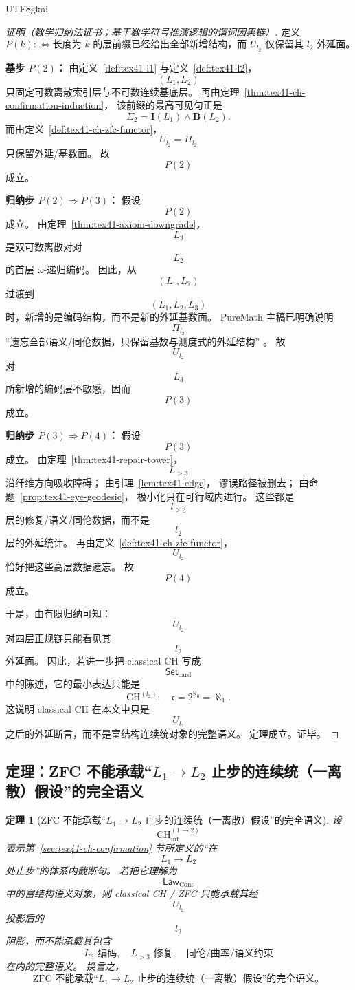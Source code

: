 \documentclass[12pt]{article}
\newtheorem{theorem}{定理}[section]
\newcommand{\CHint}{\mathrm{CH}_{\mathrm{int}}}
\newcommand{\LawCont}{\mathsf{Law}_{\mathrm{Cont}}}
\newcommand{\SetCard}{\mathsf{Set}_{\mathrm{card}}}
\newcommand{\ForgetLtwo}{U_{l_2}}
\newcommand{\ProjLtwo}{\Pi_{l_2}}
\newcommand{\CHltwo}{\mathrm{CH}^{(l_2)}}
\begin{document}
\begin{CJK*}{UTF8}{gkai}
\begin{proof}[证明（数学归纳法证书；基于数学符号推演逻辑的谓词因果链）]
定义
\[
  P(k)
  :
  \Longleftrightarrow
  \text{长度为 }k\text{ 的层前缀已经给出全部新增结构，而 }\ForgetLtwo\text{ 仅保留其 }l_2\text{ 外延面。}
\]

\textbf{基步 $P(2)$：}
由定义~\ref{def:tex41-l1} 与定义~\ref{def:tex41-l2}，
\[
  (L_1,L_2)
\]
只固定可数离散索引层与不可数连续基底层。
再由定理~\ref{thm:tex41-ch-confirmation-induction}，
该前缀的最高可见句正是
\[
  \Sigma_2=\mathbf I(L_1)\wedge \mathbf B(L_2).
\]
而由定义~\ref{def:tex41-ch-zfc-functor}，
\[
  \ForgetLtwo=\ProjLtwo
\]
只保留外延/基数面。
故
\[
  P(2)
\]
成立。

\textbf{归纳步 $P(2)\Rightarrow P(3)$：}
假设
\[
  P(2)
\]
成立。
由定理~\ref{thm:tex41-axiom-downgrade}，
\[
  L_3
\]
是双可数离散对对
\[
  L_2
\]
的首层 $\omega$-递归编码。
因此，从
\[
  (L_1,L_2)
\]
过渡到
\[
  (L_1,L_2,L_3)
\]
时，新增的是编码结构，而不是新的外延基数面。
PureMath 主稿已明确说明
\[
  \ProjLtwo
\]
“遗忘全部语义/同伦数据，只保留基数与测度式的外延结构”
\cite{GaoZheng2025GFramework}。
故
\[
  \ForgetLtwo
\]
对
\[
  L_3
\]
所新增的编码层不敏感，因而
\[
  P(3)
\]
成立。

\textbf{归纳步 $P(3)\Rightarrow P(4)$：}
假设
\[
  P(3)
\]
成立。
由定理~\ref{thm:tex41-repair-tower}，
\[
  L_{>3}
\]
沿纤维方向吸收障碍；
由引理~\ref{lem:tex41-edge}，
谬误路径被删去；
由命题~\ref{prop:tex41-eye-geodesic}，
极小化只在可行域内进行。
这些都是
\[
  l_{\ge3}
\]
层的修复/语义/同伦数据，而不是
\[
  l_2
\]
层的外延统计。
再由定义~\ref{def:tex41-ch-zfc-functor}，
\[
  \ForgetLtwo
\]
恰好把这些高层数据遗忘。
故
\[
  P(4)
\]
成立。

于是，由有限归纳可知：
\[
  \ForgetLtwo
\]
对四层正规链只能看见其
\[
  l_2
\]
外延面。
因此，若进一步把 classical CH 写成
\[
  \SetCard
\]
中的陈述，它的最小表达只能是
\[
  \CHltwo:\quad \mathfrak c=2^{\aleph_0}=\aleph_1.
\]
这说明 classical CH 在本文中只是
\[
  \ForgetLtwo
\]
之后的外延断言，而不是富结构连续统对象的完整语义。
定理成立。证毕。
\end{proof}

\subsection{定理：ZFC 不能承载“$L_1\to L_2$ 止步的连续统（一离散）假设”的完全语义}
\label{subsec:tex41-ch-zfc-theorem}

\begin{theorem}[ZFC 不能承载“$L_1\to L_2$ 止步的连续统（一离散）假设”的完全语义]
\label{thm:tex41-ch-zfc-limit}
设
\[
  \CHint^{(1\to2)}
\]
表示第~\ref{sec:tex41-ch-confirmation} 节所定义的“在
\[
  L_1\to L_2
\]
处止步”的体系内截断句。
若把它理解为
\[
  \LawCont
\]
中的富结构语义对象，则 classical CH / ZFC 只能承载其经
\[
  \ForgetLtwo
\]
投影后的
\[
  l_2
\]
阴影，而不能承载其包含
\[
  L_3\text{ 编码},\quad
  L_{>3}\text{ 修复},\quad
  \text{同伦/曲率/语义约束}
\]
在内的完整语义。
换言之，
\[
\boxed{
  \text{ZFC 不能承载“}L_1\to L_2\text{ 止步的连续统（一离散）假设”的完全语义。}
}
\]
\end{theorem}


\end{CJK*}
\end{document}
